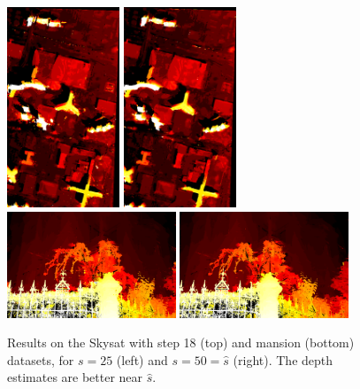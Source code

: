 \documentclass{article}
\theoremstyle{definition}
\begin{document}
\begin{figure}[ht]
  \centering
  \includegraphics[width=0.3\textwidth]{animate_skysat_ftc4/1521546364721_dmap_025.png}
  \includegraphics[width=0.3\textwidth]{animate_skysat_ftc4/1521546364721_dmap_050.png}\\[0.5cm]
  
  \includegraphics[width=0.45\textwidth]{animate_mansion/1521576787209_dmap_025.png}
  \includegraphics[width=0.45\textwidth]{animate_mansion/1521576787209_dmap_050.png}
  \caption{Results on the Skysat with step 18 (top) and mansion (bottom) datasets, for $s=25$ (left) and $s=50=\widehat{s}$ (right). The depth estimates are better near $\widehat{s}$.}
  \label{fig:finetocoarse:res}
\end{figure}
\end{document}
